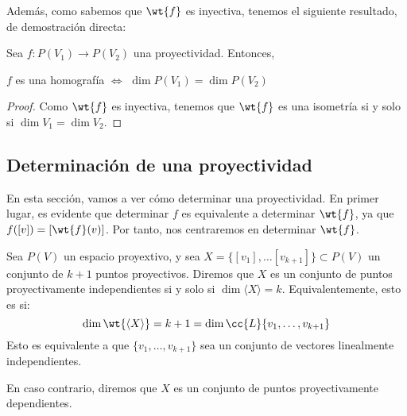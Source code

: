 Además, como sabemos que $\wt{f}$ es inyectiva, tenemos el siguiente resultado, de demostración directa:
\begin{prop}
    Sea $f:P(V_1)\to P(V_2)$ una proyectividad. Entonces,
    \begin{center}
        $f$ es una homografía $\Longleftrightarrow$ $\dim P(V_1) = \dim P(V_2)$
    \end{center}
\end{prop}
\begin{proof}
    Como $\wt{f}$ es inyectiva, tenemos que $\wt{f}$ es una isometría si y solo si $\dim V_1 = \dim V_2$.
\end{proof}

\subsection{Determinación de una proyectividad}

En esta sección, vamos a ver cómo determinar una proyectividad.
En primer lugar, es evidente que determinar $f$ es equivalente a determinar $\wt{f}$, ya que $f([v])=[\wt{f}(v)]$. Por tanto, nos centraremos en determinar $\wt{f}$.

\begin{definicion}
    Sea $P(V)$ un espacio proyextivo, y sea $X=\{[v_1],\dots [v_{k+1}]\}\subset P(V)$ un conjunto de $k+1$ puntos proyectivos.
    Diremos que $X$ es un conjunto de puntos proyectivamente independientes si y solo si $\dim \langle X \rangle = k$. Equivalentemente, esto es si:
    \begin{equation*}
        \dim \wt{\langle X \rangle} = k +1 = \dim \cc{L}\{v_1,\dots,v_{k+1}\}
    \end{equation*}
    Esto es equivalente a que $\{v_1,\dots,v_{k+1}\}$ sea un conjunto de vectores linealmente independientes.

    En caso contrario, diremos que $X$ es un conjunto de puntos proyectivamente dependientes.    
\end{definicion}

